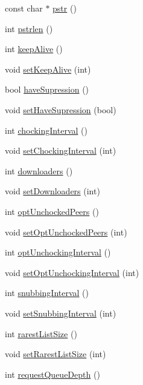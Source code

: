 \begin{DoxyCompactItemize}
const char $\ast$ \hyperlink{classBTPeerWireBase_aa7b0cc25e91a06b24f7b95574f0244cb}{pstr} ()
\item 
int \hyperlink{classBTPeerWireBase_a29176942239a5a4e8f6106cd0fc89bca}{pstrlen} ()
\item 
int \hyperlink{classBTPeerWireBase_a850b87f6cf6d6a0ade4895971ccef6f1}{keep\+Alive} ()
\item 
void \hyperlink{classBTPeerWireBase_ac7f31840e3d4b21046150178489115b0}{set\+Keep\+Alive} (int)
\item 
bool \hyperlink{classBTPeerWireBase_a06e9594abde1cb67ea5cad74334d9df5}{have\+Supression} ()
\item 
void \hyperlink{classBTPeerWireBase_a4daf47299e5700e78bb436d03fb28176}{set\+Have\+Supression} (bool)
\item 
int \hyperlink{classBTPeerWireBase_a38731ea77adc66c533c5ffdf122cec49}{chocking\+Interval} ()
\item 
void \hyperlink{classBTPeerWireBase_a12b80e9d6e09391fad908943db5b64d8}{set\+Chocking\+Interval} (int)
\item 
int \hyperlink{classBTPeerWireBase_a86978d47f64d7858603ac0427a2c20c6}{downloaders} ()
\item 
void \hyperlink{classBTPeerWireBase_ab93d18bc780a3990b06cc6eb979a7370}{set\+Downloaders} (int)
\item 
int \hyperlink{classBTPeerWireBase_a3187e8c3c18900e9fe4f1ed3f70c6e2c}{opt\+Unchocked\+Peers} ()
\item 
void \hyperlink{classBTPeerWireBase_ae813171f08455037f0ce10b0bea4d67a}{set\+Opt\+Unchocked\+Peers} (int)
\item 
int \hyperlink{classBTPeerWireBase_afa74119e211727dd403f8ef1530d2d37}{opt\+Unchocking\+Interval} ()
\item 
void \hyperlink{classBTPeerWireBase_a6514733983625bef88ebf5f1f150a7b2}{set\+Opt\+Unchocking\+Interval} (int)
\item 
int \hyperlink{classBTPeerWireBase_ac674d6064f8d1dd54f5acf2f928fc28f}{snubbing\+Interval} ()
\item 
void \hyperlink{classBTPeerWireBase_a783cb5b489206fc889f4f65d75d8faef}{set\+Snubbing\+Interval} (int)
\item 
int \hyperlink{classBTPeerWireBase_a30a1f9ba6320b0a048941a9fd7b21832}{rarest\+List\+Size} ()
\item 
void \hyperlink{classBTPeerWireBase_aaf4f7667b97a8a822aa786f733a0c0f5}{set\+Rarest\+List\+Size} (int)
\item 
int \hyperlink{classBTPeerWireBase_ad6cf7e2dcd772c4dbbe9eab522bdd0d5}{request\+Queue\+Depth} ()

\end{DoxyCompactItemize}
